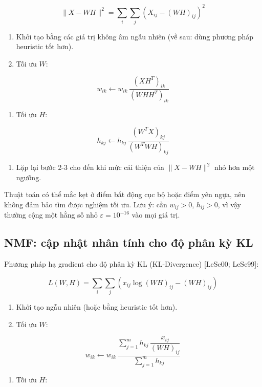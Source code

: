 \[\|X - WH\|^2 = \sum_i \sum_j \left(X_{ij} - (WH)_{ij}\right)^2\]

\begin{enumerate}
\def\labelenumi{\arabic{enumi}.}
\item
  Khởi tạo bằng các giá trị không âm ngẫu nhiên (về sau: dùng phương pháp heuristic tốt hơn).
\item
  Tối ưu \(W\):
\end{enumerate}

\[w_{ik} \leftarrow w_{ik}\,\frac{(XH^T)_{ik}}{(WHH^T)_{ik}}\]

\begin{enumerate}
\def\labelenumi{\arabic{enumi}.}
\setcounter{enumi}{2}
\item
  Tối ưu \(H\):
\end{enumerate}

\[h_{kj} \leftarrow h_{kj}\,\frac{(W^T X)_{kj}}{(W^T WH)_{kj}}\]

\begin{enumerate}
\def\labelenumi{\arabic{enumi}.}
\setcounter{enumi}{3}
\item
  Lặp lại bước 2-3 cho đến khi mức cải thiện của \(\|X - WH\|^2\) nhỏ hơn một ngưỡng.
\end{enumerate}

Thuật toán có thể mắc kẹt ở điểm bất động cục bộ hoặc điểm yên ngựa, nên không đảm bảo tìm được nghiệm tối ưu. Lưu ý: cần \(w_{ij} > 0\), \(h_{ij} > 0\), vì vậy thường cộng một hằng số nhỏ \(\varepsilon = 10^{-16}\) vào mọi giá trị.

\subsection{NMF: cập nhật nhân tính cho độ phân kỳ KL}

Phương pháp hạ gradient cho độ phân kỳ KL (KL-Divergence) {[}LeSe00; LeSe99{]}:

\[L(W,H) = \sum_i \sum_j \left( x_{ij} \log (WH)_{ij} - (WH)_{ij} \right)\]

\begin{enumerate}
\def\labelenumi{\arabic{enumi}.}
\item
  Khởi tạo ngẫu nhiên (hoặc bằng heuristic tốt hơn).
\item
  Tối ưu \(W\):
\end{enumerate}

\[w_{ik} \leftarrow w_{ik}\,\frac{\sum_{j=1}^{m} h_{kj}\,\dfrac{x_{ij}}{(WH)_{ij}}}{\sum_{j=1}^{m} h_{kj}}\]

\begin{enumerate}
\def\labelenumi{\arabic{enumi}.}
\setcounter{enumi}{2}
\item
  Tối ưu \(H\):
\end{enumerate}

